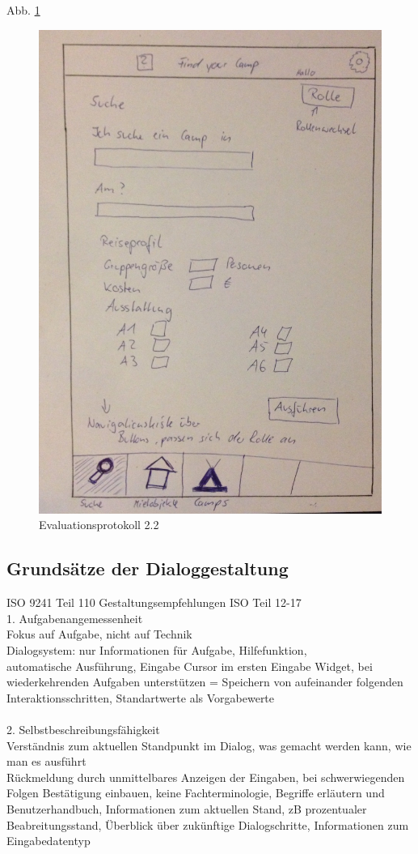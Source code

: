 Abb. \ref{fig:mainneu}
\begin{figure}[H]
\includegraphics[width=1\textwidth]{./images/mainneu.JPG}
\caption{Evaluationsprotokoll 2.2}
\label{fig:mainneu}
\end{figure}

\subsection{Grundsätze der Dialoggestaltung}
 ISO 9241 Teil 110
 Gestaltungsempfehlungen ISO Teil 12-17
\\
 1. Aufgabenangemessenheit\\
 	Fokus auf Aufgabe, nicht auf Technik\\
 	Dialogsystem: nur Informationen für Aufgabe, Hilfefunktion, \\automatische Ausführung, Eingabe Cursor im ersten Eingabe Widget, bei wiederkehrenden Aufgaben unterstützen = Speichern von aufeinander folgenden Interaktionsschritten, Standartwerte als Vorgabewerte\\
\\
 2. Selbstbeschreibungsfähigkeit\\
    Verständnis zum aktuellen Standpunkt im Dialog, was gemacht werden kann, wie man es ausführt\\
    Rückmeldung durch unmittelbares Anzeigen der Eingaben, bei schwerwiegenden Folgen Bestätigung einbauen, keine Fachterminologie, Begriffe erläutern und Benutzerhandbuch, Informationen zum aktuellen Stand, zB prozentualer Beabreitungsstand, Überblick über zukünftige Dialogschritte, Informationen zum Eingabedatentyp

